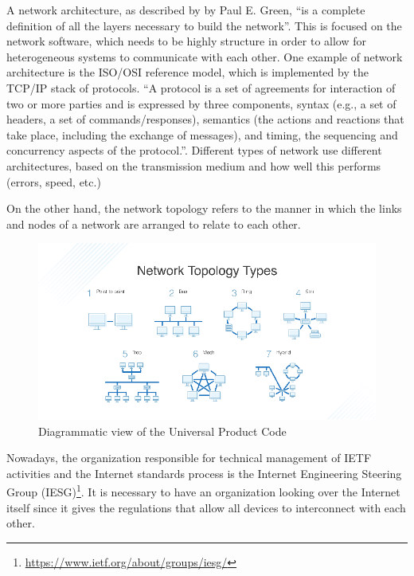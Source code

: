 	A network architecture, as described by by Paul E. Green, ``is a complete definition of all the layers necessary to build the network''\cite{nla.cat-vn252493}.
	This is focused on the network software, which needs to be highly structure in order to allow for heterogeneous systems to communicate with each other.
	One example of network architecture is the ISO/OSI reference model, which is implemented by the TCP/IP stack of protocols.
	``A protocol is a set of agreements for interaction of two or more parties and is expressed by three components, syntax (e.g., a set of headers, a set of commands/responses), semantics (the actions and reactions that take place, including the exchange of messages), and timing, the sequencing and concurrency aspects of the protocol.''\cite{nla.cat-vn252493}.
	Different types of network use different architectures, based on the transmission medium and how well this performs (errors, speed, etc.)
	
	On the other hand, the network topology refers to the manner in which the links and nodes of a network are arranged to relate to each other.
	
	
	\begin{figure}[h!]
		\centering
		\includegraphics[width=\textwidth-4cm]{resources/img/chap3/network_topologies.png}
		\caption{Diagrammatic view of the Universal Product Code}
		\label{fig:upc_patent}
	\end{figure}
	
	Nowadays, the organization responsible for technical management of IETF activities and the Internet standards process is the Internet Engineering Steering Group (IESG)\footnote{\url{https://www.ietf.org/about/groups/iesg/}}.
	It is necessary to have an organization looking over the Internet itself since it gives the regulations that allow all devices to interconnect with each other.
		
